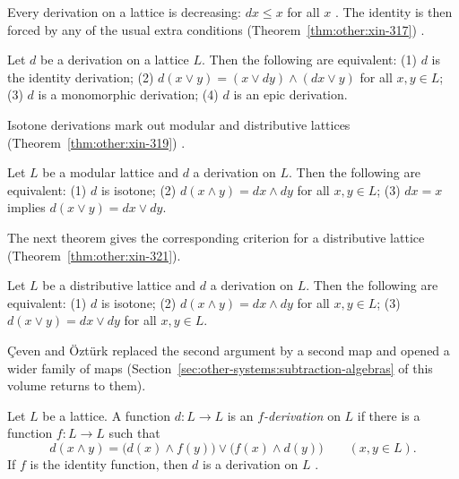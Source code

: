 Every derivation on a lattice is decreasing: $dx \le x$ for all $x$
\cite[Proposition~3.6, p.~310]{XinLiLu2008}. The identity is then forced
by any of the usual extra conditions (Theorem~\ref{thm:other:xin-317})
\cite[Theorem~3.17, p.~312]{XinLiLu2008}.\begin{theorem}\label{thm:other:xin-317}
Let $d$ be a derivation on a lattice $L$. Then the following are
equivalent: \textup{(1)} $d$ is the identity derivation; \textup{(2)}
$d(x \vee y) = (x \vee dy) \wedge (dx \vee y)$ for all $x, y \in L$;
\textup{(3)} $d$ is a monomorphic derivation; \textup{(4)} $d$ is an epic
derivation.
\end{theorem}

Isotone derivations mark out modular and distributive lattices (Theorem~\ref{thm:other:xin-319})
\cite[Theorem~3.19, p.~313]{XinLiLu2008}.\begin{theorem}\label{thm:other:xin-319}
Let $L$ be a modular lattice and $d$ a derivation on $L$. Then the
following are equivalent: \textup{(1)} $d$ is isotone; \textup{(2)}
$d(x \wedge y) = dx \wedge dy$ for all $x, y \in L$; \textup{(3)}
$dx = x$ implies $d(x \vee y) = dx \vee dy$.
\end{theorem}

The next theorem gives the corresponding criterion for a distributive lattice (Theorem~\ref{thm:other:xin-321}).

\begin{theorem}\label{thm:other:xin-321}
Let $L$ be a distributive lattice and $d$ a derivation on $L$. Then the
following are equivalent: \textup{(1)} $d$ is isotone; \textup{(2)}
$d(x \wedge y) = dx \wedge dy$ for all $x, y \in L$; \textup{(3)}
$d(x \vee y) = dx \vee dy$ for all $x, y \in L$.
\end{theorem}

{\c{C}}even and {\"O}zt{\"u}rk replaced the second argument by a second
map and opened a wider family of maps (Section~\ref{sec:other-systems:subtraction-algebras} of this
volume returns to them).

\begin{definition}\label{def:other:f-derivation}
Let $L$ be a lattice. A function $d \colon L \to L$ is an
\emph{$f$-derivation} on $L$ if there is a function $f \colon L \to L$
such that
\[
d(x \wedge y) = \bigl(d(x) \wedge f(y)\bigr) \vee \bigl(f(x) \wedge d(y)\bigr)
\qquad (x, y \in L).
\]
If $f$ is the identity function, then $d$ is a derivation on $L$
\cite[p.~702]{CevenOzturk2008}.
\end{definition}

